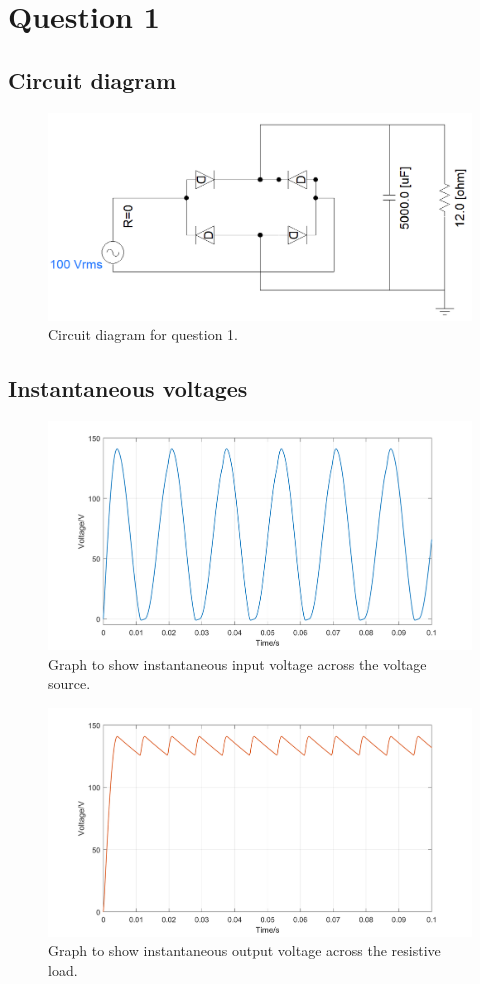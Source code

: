\section{Question 1}
\subsection{Circuit diagram}
\begin{figure}[H]
    \centering
    \includegraphics[width = \textwidth]{img/figure1.png}
    \caption{Circuit diagram for question 1.}
\end{figure}
\subsection{Instantaneous voltages}
\begin{figure}[H]
    \centering
    \includegraphics[width = \textwidth]{img/figure2.png}
    \caption{Graph to show instantaneous input voltage across the voltage source.}
\end{figure}
\begin{figure}[H]
    \centering
    \includegraphics[width = \textwidth]{img/figure3.png}
    \caption{Graph to show instantaneous output voltage across the resistive load.}
    \label{fig:resistiveLoad}
\end{figure}
